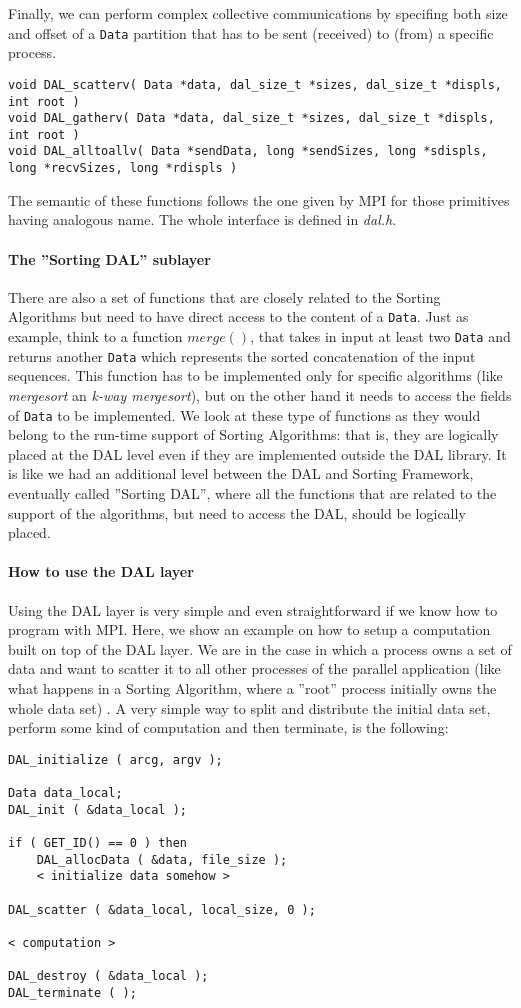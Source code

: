 Finally, we can perform complex collective communications by specifing both size and offset of a \texttt{Data} partition that has to be sent (received) to (from) a specific process. 
\begin{lstlisting}
void DAL_scatterv( Data *data, dal_size_t *sizes, dal_size_t *displs, int root )
void DAL_gatherv( Data *data, dal_size_t *sizes, dal_size_t *displs, int root )
void DAL_alltoallv( Data *sendData, long *sendSizes, long *sdispls, long *recvSizes, long *rdispls )
\end{lstlisting}
The semantic of these functions follows the one given by MPI for those primitives having analogous name. The whole interface is defined in \textit{dal.h}.

\paragraph{The ''Sorting DAL'' sublayer} There are also a set of functions that are closely related to the Sorting Algorithms but need to have direct access to the content of a \texttt{Data}.  Just as example, think to a function $merge()$, that takes in input at least two \texttt{Data} and returns another \texttt{Data} which represents the sorted concatenation of the input sequences. This function has to be implemented only for specific algorithms (like \textit{mergesort} an \textit{k-way mergesort}), but on the other hand it needs to access the fields of \texttt{Data} to be implemented. We look at these type of functions as they would belong to the run-time support of Sorting Algorithms: that is, they are logically placed at the DAL level even if they are implemented outside the DAL library. It is like we had an additional level between the DAL and Sorting Framework, eventually called ''Sorting DAL'', where all the functions that are related to the support of the algorithms, but need to access the DAL, should be logically placed. 

\paragraph{How to use the DAL layer} Using the DAL layer is very simple and even straightforward if we know how to program with MPI. Here, we show an example on how to setup a computation built on top of the DAL layer. We are in the case in which a process owns a set of data and want to scatter it to all other processes of the parallel application (like what happens in a Sorting Algorithm, where a ''root'' process initially owns the whole data set) . A very simple way to split and distribute the initial data set, perform some kind of computation and then terminate, is the following:
\begin{lstlisting}
DAL_initialize ( arcg, argv );

Data data_local;
DAL_init ( &data_local );

if ( GET_ID() == 0 ) then
	DAL_allocData ( &data, file_size );
	< initialize data somehow >
	
DAL_scatter ( &data_local, local_size, 0 );

< computation >

DAL_destroy ( &data_local );	
DAL_terminate ( );
\end{lstlisting}


